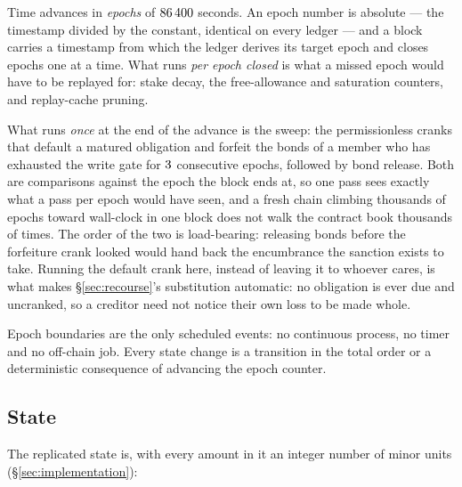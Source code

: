 Time advances in \emph{epochs} of $86\,400$ seconds. An epoch number is
absolute --- the timestamp divided by the constant, identical on every ledger --- and a
block carries a timestamp from which the ledger derives its target epoch and closes
epochs one at a time. What runs \emph{per epoch closed} is what a missed epoch would
have to be replayed for: stake decay, the free-allowance and saturation counters, and
replay-cache pruning.

What runs \emph{once} at the end of the advance is the sweep: the permissionless cranks
that default a matured obligation and forfeit the bonds of a member who has exhausted the
write gate for $3$ consecutive epochs, followed by bond release.
Both are comparisons against the epoch the block ends at, so one pass sees exactly what a
pass per epoch would have seen, and a fresh chain climbing thousands of epochs toward
wall-clock in one block does not walk the contract book thousands of times. The order of
the two is load-bearing: releasing bonds before the forfeiture crank looked would hand
back the encumbrance the sanction exists to take. Running the default crank here, instead
of leaving it to whoever cares, is what makes \S\ref{sec:recourse}'s substitution
automatic: no obligation is ever due and uncranked, so a creditor need not notice their
own loss to be made whole.

Epoch boundaries are the only scheduled events: no continuous process, no timer and no
off-chain job. Every state change is a transition in the total order or a deterministic
consequence of advancing the epoch counter.

\subsection{State}

The replicated state is, with every amount in it an integer number of minor units
(\S\ref{sec:implementation}):

